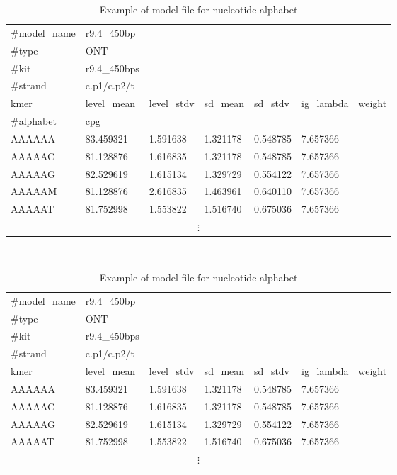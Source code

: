 \begin {table}
    \centering
    \caption{Contingency tables}
    \begin{subtable}{1\linewidth}
        \centering
        \caption{Example of model file for CpG alphabet}
                   \begin{tabular}{ l l l l l l l } 
            \hline
            \hline
            \#model\_name & r9.4\_450bp & & & & & \\%
            \#type & ONT  & & & & &\\
            \#kit & r9.4\_450bps  & & & & & \\
            \#strand & c.p1/c.p2/t & & & & & \\
            kmer & level\_mean & level\_stdv & sd\_mean & sd\_stdv & ig\_lambda & weight \\
            \#alphabet & cpg  & & & & & \\
            AAAAAA & 83.459321 & 1.591638 & 1.321178 & 0.548785 & 7.657366 \\
            AAAAAC & 81.128876 & 1.616835 & 1.321178 & 0.548785 & 7.657366 \\
            AAAAAG & 82.529619 & 1.615134 & 1.329729 & 0.554122 & 7.657366 \\
            AAAAAM & 81.128876 & 2.616835 & 1.463961 & 0.640110 & 7.657366\\
            AAAAAT & 81.752998 & 1.553822 & 1.516740 & 0.675036 & 7.657366\\
            \multicolumn{7}{c}{$\vdots$} \\

             \hline
        \end{tabular}
        \label{table:modelfiles-cpg}
    \end{subtable}
    ~\vspace*{1 cm}

    \begin{subtable}{1\linewidth}
        \centering
        \caption{Example of model file for nucleotide alphabet}
        \begin{tabular}{ l l l l l l l } 
            \hline
            \#model\_name & r9.4\_450bp & & & & & \\%
            \#type & ONT  & & & & &\\
            \#kit & r9.4\_450bps  & & & & & \\
            \#strand & c.p1/c.p2/t & & & & & \\
            kmer & level\_mean & level\_stdv & sd\_mean & sd\_stdv & ig\_lambda & weight \\
            AAAAAA & 83.459321 & 1.591638 & 1.321178 & 0.548785 & 7.657366 \\
            AAAAAC & 81.128876 & 1.616835 & 1.321178 & 0.548785 & 7.657366 \\
            AAAAAG & 82.529619 & 1.615134 & 1.329729 & 0.554122 & 7.657366 \\
            AAAAAT & 81.752998 & 1.553822 & 1.516740 & 0.675036 & 7.657366\\
            \multicolumn{7}{c}{$\vdots$} \\


\end{tabular}
\end{subtable}
\end{table}
